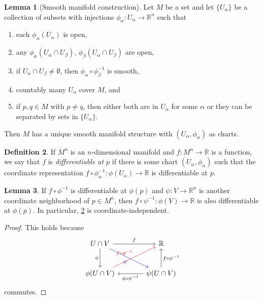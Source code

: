 \documentclass[10pt,letterpaper,cm]{nupset}
\theoremstyle{definition}
\newtheorem{definition}{Definition}[subsection]
\theoremstyle{theorem}
\newtheorem{lemma}[definition]{Lemma}
\theoremstyle{remark}
\newcommand{\R}{\mathbb R}
\newcommand{\1}{\mathbf{1}}
\newcommand{\0}{\vec 0}
\begin{document}
\begin{lemma}[Smooth manifold construction]\label{smc}
Let $M$ be a set and let $\{U_\alpha\}$ be a collection of subsets with injections $\phi_\alpha : U_\alpha \to \R^n$ such that
\begin{enumerate}
\item each $\phi_\alpha(U_\alpha)$ is open,
\item any $\phi_\alpha(U_\alpha \cap U_\beta)$, $\phi_\beta(U_\alpha \cap U_\beta)$ are open,
\item if $U_\alpha \cap U_\beta \ne \emptyset$, then $\phi_\alpha \circ \phi_\beta^{-1}$ is smooth, 
\item countably many $U_\alpha$ cover $M$, and
\item if $p, q\in M$ with $p\ne q$, then either both are in $U_\alpha$ for some $\alpha$ or they can be separated by sets in $\{U_\alpha\}$.
\end{enumerate}

Then $M$ has a unique smooth manifold structure with $\left(U_\alpha, \phi_\alpha\right)$ as charts. 
\end{lemma}

\begin{definition}\label{d1}
If $M^n$ is an $n$-dimensional manifold and $f: M^n \to \R$ is a function, we say that $f$ is \textit{differentiable at $p$} if there is some chart $(U_\alpha, \phi_\alpha)$ such that the coordinate representation $f\circ \phi_\alpha^{-1}: \phi(U_\alpha) \to \R$ is differentiable at $p$.
\end{definition}

\begin{lemma}
If $f \circ \phi^{-1}$ is differentiable at $\phi(p)$ and $\psi: V \to \R^n$ is another coordinate neighborhood of $p\in M^n$, then $f \circ \psi^{-1}: \phi(V) \to \R$ is also differentiable at $\phi(p)$. In particular, \cref{d1} is coordinate-independent. 
\end{lemma}
\begin{proof}
This holds because
\[ \begin{tikzcd}[row sep=large, column sep=large]
U \cap V \arrow[to=Z, "\phi", swap] \arrow[to=2-2, dr, blue, "\psi", swap]
& \R \\
|[alias=Z]| \phi(U \cap V) \arrow[to=1-2, ur, red, "f\circ \phi^{-1}"] 
& \psi(U \cap V)
\arrow[from=ul, to=1-2, "f"] \arrow[to=Z, "\phi \circ \psi^{-1}"] \arrow[to=1-2, "f \circ \psi^{-1}", swap] 
\end{tikzcd}
\]
commutes.
\end{proof}
\end{document}
